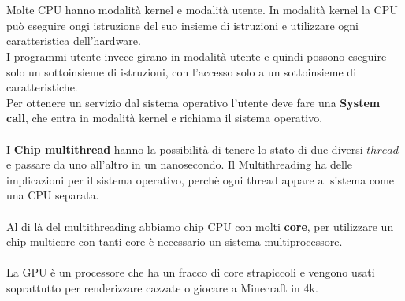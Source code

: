 \documentclass{article}
\begin{document}
\\
\\
Molte CPU hanno modalità kernel e modalità utente. In modalità kernel la CPU può eseguire 
ongi istruzione del suo insieme di istruzioni e utilizzare ogni caratteristica dell'hardware.
\\I programmi utente invece girano in modalità utente e quindi possono eseguire solo un sottoinsieme 
di istruzioni, con l'accesso solo a un sottoinsieme di caratteristiche.\\
Per ottenere un servizio dal sistema operativo l'utente deve fare una \textbf{System call}, che entra in modalità 
kernel e richiama il sistema operativo.
\\
\\
I \textbf{Chip multithread} hanno la possibilità di tenere lo stato di due diversi $thread$ e passare da uno all'altro in un nanosecondo.
Il Multithreading ha delle implicazioni per il sistema operativo, perchè ogni thread appare al sistema come una CPU separata. 
\\
\\
Al di là del multithreading abbiamo chip CPU con molti \textbf{core}, per utilizzare un chip multicore con tanti core è necessario un sistema 
multiprocessore. 
\\
\\
La GPU è un processore che ha un fracco di core strapiccoli e vengono usati soprattutto per renderizzare cazzate o giocare a Minecraft in 4k.
\end{document}
